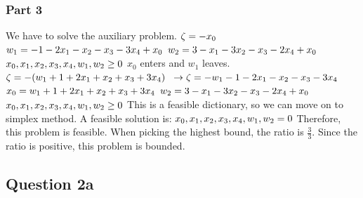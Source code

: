 \documentclass{article}
\begin{document}
\subsubsection*{Part 3}
We have to solve the auxiliary problem.
$\\\zeta = -x_0$
$\\ w_1 = - 1 - 2x_1 - x_2 - x_3 - 3x_4 + x_0$
$\\ w_2 = 3 - x_1 - 3x_2 - x_3 - 2x_4 + x_0$
$\\ x_0, x_1, x_2, x_3, x_4, w_1, w_2 \geq 0$
\newline $x_0$ enters and $w_1$ leaves.
$\\\zeta = -(w_1 + 1 + 2x_1 + x_2 + x_3 + 3x_4)$
$\\\to \zeta = -w_1 - 1 - 2x_1 - x_2 - x_3 - 3x_4$
$\\ x_0 = w_1 + 1 + 2x_1 + x_2 + x_3 + 3x_4$
$\\ w_2 = 3 - x_1 - 3x_2 - x_3 - 2x_4 + x_0$
$\\ x_0, x_1, x_2, x_3, x_4, w_1, w_2 \geq 0$
\newline This is a feasible dictionary, so we can move on to simplex method.
\newline A feasible solution is:
$\\ x_0, x_1, x_2, x_3, x_4, w_1, w_2 = 0$
\newline Therefore, this problem is feasible.
\newline When picking the highest bound, the ratio is $\frac{3}{3}$. Since the ratio is positive, this problem is bounded.

\newpage
\subsection*{Question 2a}
\end{document}
